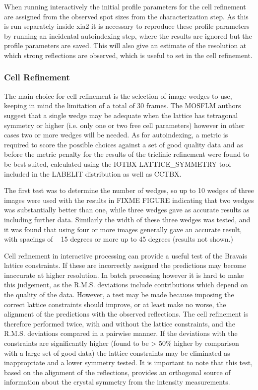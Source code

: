 \documentclass[a4paper, 11pt]{article}
\begin{document}
When running interactively the initial profile parameters for the cell refinement are assigned from the observed spot sizes from the characterization step. As this is run separately inside xia2 it is necessary to reproduce these profile parameters by running an incidental autoindexing step, where the results are ignored but the profile parameters are saved. This will also give an estimate of the resolution at which strong reflections are observed, which is useful to set in the cell refinement.

\subsubsection{Cell Refinement}

The main choice for cell refinement is the selection of image wedges to use, keeping in mind the limitation of a total of 30 frames. The MOSFLM authors suggest that a single wedge may be adequate when the lattice has tetragonal symmetry or higher (i.e. only one or two free cell parameters) however in other cases two or more wedges will be needed. As for autoindexing, a metric is required to score the possible choices against a set of good quality data and as before the metric penalty for the results of the triclinic refinement were found to be best suited, calculated using the IOTBX LATTICE\_SYMMETRY tool included in the LABELIT distribution as well as CCTBX. 

The first test was to determine the number of wedges, so up to 10 wedges of three images were used with the results in FIXME FIGURE indicating that two wedges was substantially better than one, while three wedges gave as accurate results as including further data. Similarly the width of these three wedges was tested, and it was found that using four or more images generally gave an accurate result, with spacings of ~ 15 degrees or more up to 45 degrees (results not shown.) 

Cell refinement in interactive processing can provide a useful test of the Bravais lattice constraints. If these are incorrectly assigned the predictions may become inaccurate at higher resolution. In batch processing however it is hard to make this judgement, as the R.M.S. deviations include contributions which depend on the quality of the data. However, a test may be made because imposing the correct lattice constraints should improve, or at least make no worse, the alignment of the predictions with the observed reflections. The cell refinement is therefore performed twice, with and without the lattice constraints, and the R.M.S. deviations compared in a pairwise manner. If the deviations with the constraints are significantly higher (found to be > 50\% higher by comparison with a large set of good data) the lattice constraints may be eliminated as inappropriate and a lower symmetry tested. It is important to note that this test, based on the alignment of the reflections, provides an orthogonal source of information about the crystal symmetry from the intensity measurements.
\end{document}
